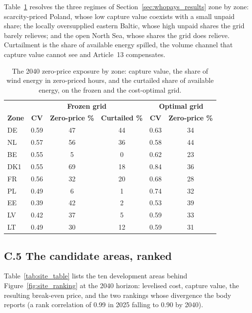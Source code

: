 Table~\ref{tab:whopays_zones} resolves the three regimes of
Section~\ref{sec:whopays_results} zone by zone: scarcity-priced Poland, whose
low capture value coexists with a small unpaid share; the locally oversupplied
eastern Baltic, whose high unpaid shares the grid barely relieves; and the
open North Sea, whose shares the grid does relieve. Curtailment is the share
of available energy spilled, the volume channel that capture value cannot see
and Article~13 compensates.

\begin{table}[!htb]
\centering\small
\caption{The 2040 zero-price exposure by zone: capture value, the share of
wind energy in zero-priced hours, and the curtailed share of available energy,
on the frozen and the cost-optimal grid.}
\label{tab:whopays_zones}
\begin{tabular}{l c c c c c}
\toprule
& \multicolumn{3}{c}{\textbf{Frozen grid}} &
\multicolumn{2}{c}{\textbf{Optimal grid}} \\
\textbf{Zone} & \textbf{CV} & \textbf{Zero-price \%} & \textbf{Curtailed \%} &
\textbf{CV} & \textbf{Zero-price \%} \\
\midrule
DE  & 0.59 & 47 & 44 & 0.63 & 34 \\
NL  & 0.57 & 56 & 36 & 0.58 & 44 \\
BE  & 0.55 & 5  & 0  & 0.62 & 23 \\
DK1 & 0.55 & 69 & 18 & 0.84 & 36 \\
FR  & 0.56 & 32 & 20 & 0.68 & 28 \\
PL  & 0.49 & 6  & 1  & 0.74 & 32 \\
EE  & 0.39 & 42 & 2  & 0.53 & 39 \\
LV  & 0.42 & 37 & 5  & 0.59 & 33 \\
LT  & 0.49 & 30 & 12 & 0.59 & 31 \\
\bottomrule
\end{tabular}
\end{table}

\subsection*{C.5 The candidate areas, ranked}

Table~\ref{tab:site_table} lists the ten development areas behind
Figure~\ref{fig:site_ranking} at the 2040 horizon: levelised cost, capture
value, the resulting break-even price, and the two rankings whose divergence
the body reports (a rank correlation of 0.99 in 2025 falling to 0.90 by 2040).

